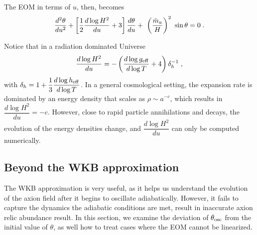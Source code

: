 \documentclass[11pt,a4paper]{article}
\begin{document}
The EOM in terms of $u$, then, becomes
%
\begin{equation}
	\dfrac{d^2  \theta}{du^2} + \left[ \dfrac{1}{2} \dfrac{d \log H^2}{du} + 3  \right] \dfrac{d  \theta}{d u} + \ \left( \dfrac{\tilde m_{a}{}}{H} \right)^2 \ \sin \theta
	=0 \;.
	\label{eq:eom_u}
\end{equation}

Notice that in a radiation dominated Universe
%
$$
\dfrac{d \log H^2}{du} = -\left(  \dfrac{d \log g_{\rm eff}{}}{d \log T} +4  \right) \delta_h^{-1}\;,
$$
with  $ \delta_h = 1+ \dfrac{1}{3} \dfrac{d \log h_{\rm eff}{}}{d \log T} $. 
%
In a general cosmological setting, the expansion rate is dominated by an energy density that scales as $\rho \sim a^{-c}$, which results in $\dfrac{d \log H^2}{du}  = -c$. However, close to rapid particle annihilations and decays, the evolution of the energy densities change, and $\dfrac{d \log H^2}{du}$ can only be computed numerically.

\subsection{Beyond the WKB approximation}\label{sec:beyond_WKB}
%
The WKB approximation is very useful, as it helps us understand the evolution of the axion field after it begins to oscillate adiabatically. However, it fails to capture the dynamics the adiabatic conditions are met, result in inaccurate axion relic abundance result. In this section, we examine the deviation of $\theta_{\rm osc}{}$ from the initial value of $\theta$, as well how to treat cases where the EOM cannot be linearized.
\end{document}
